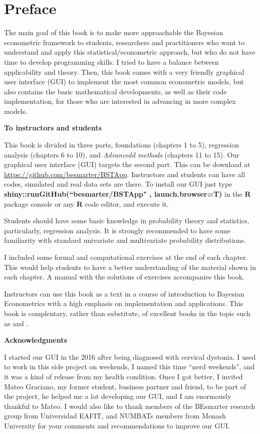 \chapter*{Preface}
The main goal of this book is to make more approachable the Bayesian econometric framework to students, researchers and practitioners who want to understand and apply this statistical/econometric approach, but who do not have time to develop programming skills. I tried to have a balance between applicability and theory. Then, this book comes with a very friendly graphical user interface (GUI) to implement the most common econometric models, but also contains the basic mathematical developments, as well as their code implementation, for those who are interested in advancing in more complex models.

\textbf{To instructors and students}

This book is divided in three parts, foundations (chapters 1 to 5), regression analysis (chapters 6 to 10), and \textit{Advancedd methods} (chapters 11 to 15). Our graphical user interface (GUI) targets the second part. This can be download at \href{https://github.com/besmarter/BSTApp}{https://github.com/besmarter/BSTApp}. Instructors and students can have all codes, simulated and real data sets are there. To install our GUI just type \textbf{shiny::runGitHub(``besmarter/BSTApp" , launch.browser=T)} in the \textbf{R} package console or any \textbf{R} code editor, and execute it.

Students should have some basic knowledge in probability theory and statistics, particularly, regression analysis. It is strongly recommended to have some familiarity with standard univariate and multivariate probability distributions.

I included some formal and computational exercises at the end of each chapter. This would help students to have a better understanding of the material shown in each chapter. A manual with the solutions of exercises accompanies this book.

Instructors can use this book as a text in a course of introduction to Bayesian Econometrics with a high emphasis on implementation and applications. This book is complentary, rather than substitute, of excellent books in the topic such as \cite{rossi2012bayesian,greenberg2012introduction, geweke2005contemporary, lancaster2004introduction} and \cite{koop2003bayesian}.

\textbf{Acknowledgments}

I started our GUI in the 2016 after being diagnosed with cervical dystonia. I used to work in this side project on weekends, I named this time ``nerd weekends", and it was a kind of release from my health condition. Once I got better, I invited Mateo Graciano, my former student, business partner and friend, to be part of the project, he helped me a lot developing our GUI, and I am enormously thankful to Mateo. I would also like to thank members of the BEsmarter research group from Universidad EAFIT, and NUMBATs members from Monash University for your comments and recommendations to improve our GUI.


